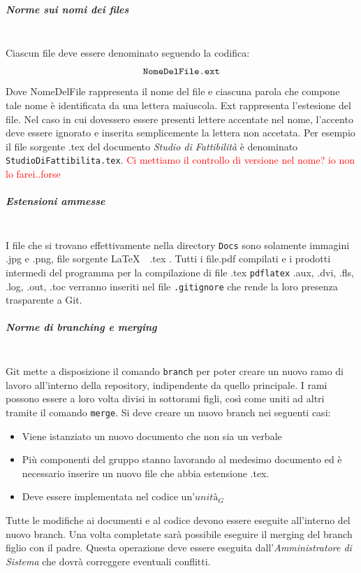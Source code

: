 			\subparagraph{Norme sui nomi dei files} \mbox{} \\
			Ciascun file deve essere denominato seguendo la codifica:
					$$\text{\texttt{NomeDelFile.ext}}$$
			Dove NomeDelFile rappresenta il nome del file e ciascuna parola che compone tale nome è identificata da una lettera maiuscola. Ext rappresenta l'estesione del file. Nel caso in cui dovessero essere presenti lettere accentate nel nome, l'accento deve essere ignorato e inserita semplicemente la lettera non accetata. Per esempio il file sorgente .tex del documento \emph{Studio di Fattibilità} è denominato \texttt{StudioDiFattibilita.tex}. \textcolor{red}{Ci mettiamo il controllo di versione nel nome? io non lo farei..forse}
			
			\subparagraph{Estensioni ammesse} \mbox{} \\
			I file che si trovano effettivamente nella directory \texttt{Docs} sono solamente immagini .jpg e .png, file sorgente \LaTeX $\text{ }$ .tex . Tutti i file.pdf compilati e i prodotti intermedi del programma per la compilazione di file .tex \texttt{pdflatex} .aux, .dvi, .fls, .log, .out, .toc verranno inseriti nel file \texttt{.gitignore} che rende la loro presenza trasparente a Git.
			
			\subparagraph{Norme di branching e merging} \mbox{} \\
			Git mette a disposizione il comando \texttt{branch} per poter creare un nuovo ramo di lavoro all'interno della repository, indipendente da quello principale. I rami possono essere a loro volta divisi in sottorami figli, così come uniti ad altri tramite il comando \texttt{merge}. Si deve creare un nuovo branch nei seguenti casi:
			\begin{itemize}
				\item Viene istanziato un nuovo documento che non sia un verbale
				\item Più componenti del gruppo stanno lavorando al medesimo documento ed è necessario inserire un nuovo file che abbia estensione .tex. 
				\item Deve essere implementata nel codice un'$unità_G$
			\end{itemize}
			Tutte le modifiche ai documenti e al codice devono essere eseguite all'interno del nuovo branch. Una volta completate sarà possibile eseguire il merging del branch figlio con il padre. Questa operazione deve essere eseguita dall'\emph{Amministratore di Sistema} che dovrà correggere eventuali conflitti.
			
